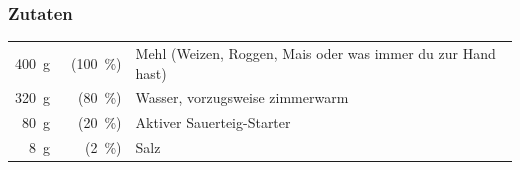 \subsubsection*{Zutaten}
\begin{tabular}{r@{}rl@{}}
\qty{400}{\gram} &~(\qty{100}{\percent}) & Mehl (Weizen, Roggen, Mais oder was
                                            immer du zur Hand hast)\\
\qty{320}{\gram} &  (\qty{80}{\percent}) & Wasser, vorzugsweise
                                            zimmerwarm\\
\qty{80}{\gram}  &  (\qty{20}{\percent}) & Aktiver Sauerteig-Starter\\
\qty{8}{\gram}   &   (\qty{2}{\percent}) & Salz\\
\end{tabular}

